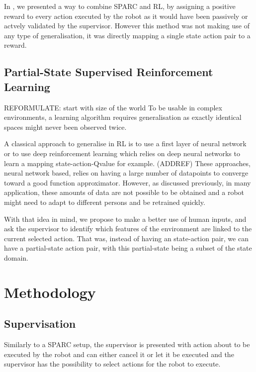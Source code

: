 \documentclass[letterpaper]{article} %
\begin{document}
In \cite{senft2017supervised}, we presented a way to combine SPARC and RL, by
assigning a positive reward to every action executed by the robot as it would
have been passively or actvely validated by the supervisor. However this method
was not making use of any type of generalisation, it was directly mapping a
single state action pair to a reward. 

\subsection{Partial-State Supervised Reinforcement Learning}

REFORMULATE: start with size of the world
To be usable in complex environments, a
learning algorithm requires generalisation as exactly identical spaces might
never been observed twice.

A classical approach to generalise in RL is to use a first layer of neural
network or to use deep reinforcement learning which relies on deep neural
networks to learn a mapping state-action-Qvalue for example. (ADDREF)
These approaches, neural network based, relies on having a large number of
datapoints to converge toward a good function approximator. However, as
discussed previously, in many application, these amounts of data are not
possible to be obtained and a robot might need to adapt to different persons and
be retrained quickly.

With that idea in mind, we propose to make a better use of human inputs, and ask
 the supervisor to identify which features of the environment are linked to the
 current selected action. That was, instead of having an state-action pair, we
 can have a partial-state action pair, with this partial-state being a subset of
 the state domain.

\section{Methodology}

\subsection{Supervisation}
Similarly to a SPARC setup, the supervisor is presented with action about to be
executed by the robot and can either cancel it or let it be executed and the 
supervisor has the possibility to select actions for the robot to execute.
\end{document}
